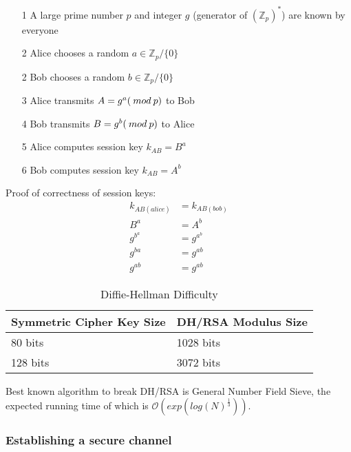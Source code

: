 \documentclass[a4paper]{article}
\begin{document}

\begin{enumerate}
  \item[1] A large prime number $p$ and integer $g$ (generator of
           $(\mathbb{Z}_{p})^{*}$) are known by everyone
  \item[2] Alice chooses a random $a \in \mathbb{Z}_{p} / \{0\}$
  \item[2] Bob chooses a random $b \in \mathbb{Z}_{p} / \{0\}$
  \item[3] Alice transmits $A = g^{a} (\: mod \: p)$ to Bob
  \item[4] Bob transmits $B = g^{b} (\: mod \: p)$ to Alice
  \item[5] Alice computes session key $k_{AB} = B^{a}$
  \item[6] Bob computes session key $k_{AB} = A^{b}$
\end{enumerate}


Proof of correctness of session keys:
\begin{align*}
  k_{AB(alice)} &= k_{AB(bob)} \\
  B^{a} &= A^{b} \\
  g^{b^{a}} &= g^{a^{b}} \\
  g^{ba} &= g^{ab} \\
  g^{ab} &= g^{ab}
\end{align*}


\begin{table}[h]
  \centering
  \begin{tabular}{@{}ll@{}}
    \toprule
    Symmetric Cipher Key Size & DH/RSA Modulus Size \\
    \midrule
    80 bits                   & 1028 bits           \\
    128 bits                  & 3072 bits           \\
    \bottomrule
  \end{tabular}
  \caption{Diffie-Hellman Difficulty}
  \label{tab:diffie_hellman_difficulty}
\end{table}
\FloatBarrier

Best known algorithm to break DH/RSA is General Number Field Sieve, the expected
running time of which is $\mathcal{O}(exp(log(N)^{\frac{1}{3}}))$.

\subsubsection{Establishing a secure channel}
\end{document}
